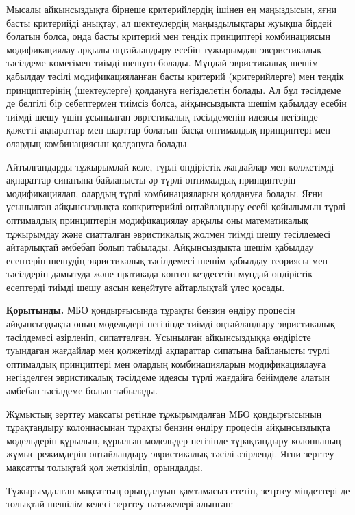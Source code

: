 \begin{multicols}{2}
Мысалы айқынсыздықта бірнеше критерийлердің ішінен ең маңыздысын, яғни
басты критерийді анықтау, ал шектеулердің маңыздылықтары жуықша бірдей
болатын болса, онда басты критерий мен теңдік принциптері комбинациясын
модификациялау арқылы оңтайландыру есебін тұжырымдап эвсристикалық
тәсілдеме көмегімен тиімді шешуго болады. Мұндай эвристикалық шешім
қабылдау тәсілі модификацияланған басты критерий (критерийлерге) мен
теңдік принциптерінің (шектеулерге) қолдануға негізделетін болады. Ал
бұл тәсілдеме де белгілі бір себептермен тиімсіз болса, айқынсыздықта
шешім қабылдау есебін тиімді шешу үшін ұсынылған эвртстикалық
тәсілдеменің идеясы негізінде қажетті ақпараттар мен шарттар болатын
басқа оптималдық принциптері мен олардың комбинациясын қолдануға болады.

Айтылғандарды тұжырымлай келе, түрлі өндірістік жағдайлар мен қолжетімді
ақпараттар сипатына байланысты әр түрлі оптималдық принциптерін
модификациялап, олардың түрлі комбинацияларын қолдануға болады. Яғни
ұсынылған айқынсыздықта көпкритерийлі оңтайландыру есебі қойылымын түрлі
оптималдық принциптерін модификациялау арқылы оны математикалық
тұжырымдау және сиатталған эвристикалық жолмен тиімді шешу тәсілдемесі
айтарлықтай әмбебап болып табылады. Айқынсыздықта шешім қабылдау
есептерін шешудің эвристикалық тәсілдемесі шешім қабылдау теориясы мен
тәсілдерін дамытуда және пратикада көптеп кездесетін мұндай өндірістік
есептерді тиімді шешу аясын кеңейтуге айтарлықтай үлес қосады.

{\bfseries Қорытынды.} МБӨ қондырғысында тұрақты бензин өндіру процесін
айқынсыздықта оның модельдері негізінде тиімді оңтайландыру эвристикалық
тәсілдемесі әзірленіп, сипатталған. Ұсынылған айқынсыздыққа өндірісте
туындаған жағдайлар мен қолжетімді ақпараттар сипатына байланысты түрлі
оптималдық принциптері мен олардың комбинацияларын модификациялауға
негізделген эвристикалық тәсілдеме идеясы түрлі жағдайға бейімделе
алатын әмбебап тәсілдеме болып табылады.

Жұмыстың зерттеу мақсаты ретінде тұжырымдалған МБӨ қондырғысының
тұрақтандыру колоннасынан тұрақты бензин өндіру процесін айқынсыздықта
модельдерін құрылып, құрылған модельдер негізінде тұрақтандыру
колоннаның жұмыс режимдерін оңтайландыру эвристикалық тәсілі әзірленді.
Яғни зерттеу мақсатты толықтай қол жеткізіліп, орындалды.

Тұжырымдалған мақсаттың орындалуын қамтамасыз ететін, зетртеу міндеттері
де толықтай шешілім келесі зерттеу нәтижелері алынған:


\end{multicols}
